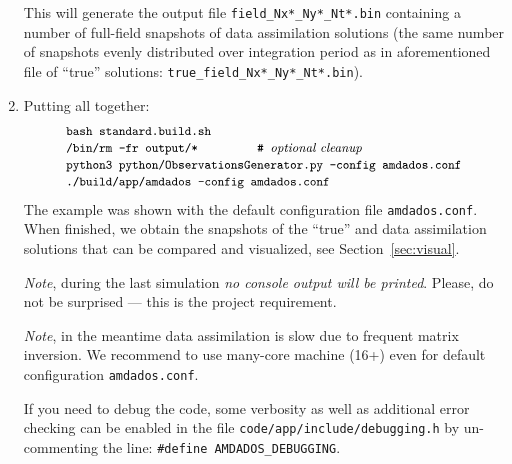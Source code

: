 \documentclass[]{article}
\begin{document}
\begin{enumerate}
$$$$
This will generate the output file \texttt{field\_Nx*\_Ny*\_Nt*.bin} containing a number of full-field snapshots of data assimilation solutions (the same number of snapshots evenly distributed over integration period as in aforementioned file of ``true'' solutions: \texttt{true\_field\_Nx*\_Ny*\_Nt*.bin}).
\item Putting all together:
$$
\begin{array}{l}
\mbox{\small\texttt{bash standard.build.sh}} \\
\mbox{\small\texttt{/bin/rm -fr output/* \qquad\qquad \# {\it optional cleanup}}} \\
\mbox{\small\texttt{python3 python/ObservationsGenerator.py --config amdados.conf}} \\
\mbox{\small\texttt{./build/app/amdados --config amdados.conf}}
\end{array}
$$
The example was shown with the default configuration file \texttt{amdados.conf}. When finished, we obtain the snapshots of the ``true'' and data assimilation solutions that can be compared and visualized, see Section~\ref{sec:visual}.

\textit{Note}, during the last simulation \textit{no console output will be printed}. Please, do not be surprised --- this is the project requirement.

\textit{Note}, in the meantime data assimilation is slow due to frequent matrix inversion. We recommend to use many-core machine (16+) even for default configuration \texttt{amdados.conf}.

If you need to debug the code, some verbosity as well as additional error checking can be enabled in the file \texttt{code/app/include/debugging.h} by un-commenting the line: \texttt{\#define AMDADOS\_DEBUGGING}.
\end{enumerate}
\end{document}
